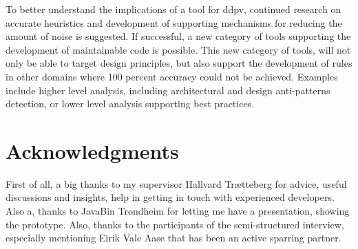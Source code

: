 \documentclass{report}
\begin{document}
To better understand the implications of a tool for \gls{ddpv}, continued research on accurate heuristics and development of supporting mechanisms for reducing the amount of noise is suggested. If successful, a new category of tools supporting the development of maintainable code is possible. This new category of tools, will not only be able to target design principles, but also support the development of rules in other domains where 100 percent accuracy could not be achieved. Examples include higher level analysis, including architectural and design anti-patterns detection, or lower level analysis supporting best practices.

\section{Acknowledgments}
\label{acknowledgements}
First of all, a big thanks to my supervisor Hallvard Trætteberg for advice, useful discussions and insights, help in getting in touch with experienced developers. Also a, thanks to JavaBin Trondheim for letting me have a presentation, showing the prototype. Also, thanks to the participants of the semi-structured interview, especially mentioning Eirik Vale Aase that has been an active sparring partner. 

\printbibliography

\appendix
\label{appendix}

\end{document}

